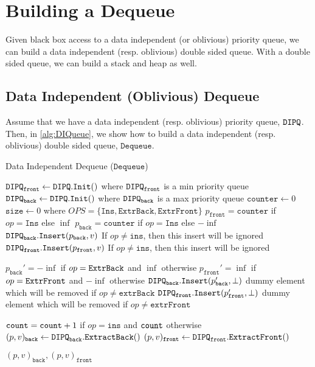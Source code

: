 \newcommand{\DeQ}{\texttt{Dequeue}}
\newcommand{\DeQAccess}{\texttt{Access}}
\newcommand{\DIPQFr}{\DIPQ_{\texttt{front}}}
\newcommand{\DIPQBack}{\DIPQ_{\texttt{back}}}
\newcommand{\DeQCouner}{\texttt{counter}}
\newcommand{\DeQSize}{\texttt{size}}
\newcommand{\DeQExtractFront}{\texttt{ExtractFront}}
\newcommand{\DeQExtractBack}{\texttt{ExtractBack}}

\section{Building a Dequeue}
Given black box access to a data independent (or oblivious) priority queue,
we can build a data independent (resp. oblivious) double sided queue.
With a double sided queue, we can build a stack and heap as well.

\subsection{Data Independent (Oblivious) Dequeue}
Assume that we have a data independent (resp. oblivious) priority queue, $\texttt{DIPQ}$.
Then, in \cref{alg:DIQueue}, we show how to build a data independent (resp. oblivious) double sided queue, $\DeQ$.

\begin{algorithm}
	\caption{Data Independent Dequeue ($\DeQ$)}
	\label{alg:DEQueue}
	\begin{algorithmic}[1]
		\Function{$\DIPQInit$}{}
		\State $\DIPQFr \gets \DIPQ.\DIPQInit()$ where $\DIPQFr$ is a min priority queue
		\State $\DIPQBack \gets \DIPQ.\DIPQInit()$ where $\DIPQBack$ is a max priority queue
		\State $\DeQCouner \gets 0$
		\State $\DeQSize \gets 0$
		\EndFunction
		\Function{$\DeQAccess$}{$v, op \in OPS$} \Comment where $OPS = \{\texttt{Ins}, \texttt{ExtrBack}, \texttt{ExtrFront}\}$
			\State $p_{\texttt{front}} = \DeQCouner$ if $op = \texttt{Ins}$ else $\inf$ 
			\State $p_{\texttt{back}} = \DeQCouner$ if $op = \texttt{Ins}$ else $-\inf$
		 	\State $\DIPQBack.\DIPQInsert(p_{\texttt{back}}, v)$ \Comment If $op \neq \texttt{ins}$, then this insert will be ignored
		 	\State $\DIPQFr.\DIPQInsert(p_{\texttt{front}}, v)$ \Comment If $op \neq \texttt{ins}$, then this insert will be ignored

			\State $p_{\texttt{back}}' = -\inf$ if $op = \texttt{\texttt{ExtrBack}}$ and $\inf$ otherwise
			\State $p_{\texttt{front}}' = \inf$ if $op = \texttt{\texttt{ExtrFront}}$ and $-\inf$ otherwise
		 	\State $\DIPQBack.\DIPQInsert(p_{\texttt{back}}', \bot)$ \Comment dummy element which will be removed if $op \neq \texttt{extrBack}$
		 	\State $\DIPQFr.\DIPQInsert(p_{\texttt{front}}', \bot)$ \Comment dummy element which will be removed if $op \neq \texttt{extrFront}$

			\State ${\texttt{count}} = {\texttt{count}} + 1$ if $op = \texttt{ins}$ and ${\texttt{count}}$ otherwise
		 	\State $(p, v)_\texttt{back} \gets \DIPQBack.\texttt{ExtractBack}()$
		 	\State $(p, v)_\texttt{front} \gets \DIPQFr.\DIPQExtract()$

			\State \Return $(p, v)_\texttt{back}, (p, v)_\texttt{front}$
		\EndFunction
	\end{algorithmic}
\end{algorithm}

